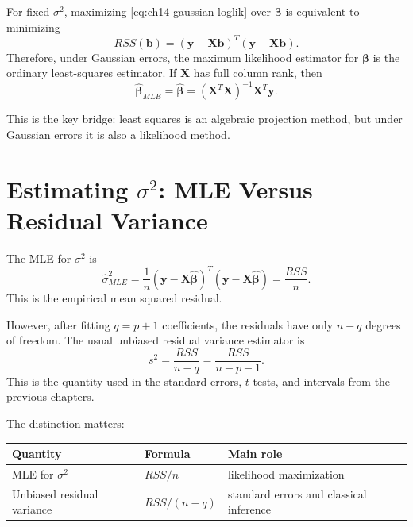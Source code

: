 For fixed \(\sigma^2\), maximizing \eqref{eq:ch14-gaussian-loglik} over \(\boldsymbol{\beta}\) is equivalent to minimizing
\begin{equation}
  RSS(\mathbf{b})=(\mathbf{y}-\mathbf{X}\mathbf{b})^T(\mathbf{y}-\mathbf{X}\mathbf{b}).
\end{equation}
Therefore, under Gaussian errors, the maximum likelihood estimator for \(\boldsymbol{\beta}\) is the ordinary least-squares estimator.  If \(\mathbf{X}\) has full column rank, then
\begin{equation}
  \boxed{
  \widehat{\boldsymbol{\beta}}_{MLE}
  =\widehat{\boldsymbol{\beta}}
  = (\mathbf{X}^T\mathbf{X})^{-1}\mathbf{X}^T\mathbf{y}.
  }
\end{equation}

This is the key bridge: least squares is an algebraic projection method, but under Gaussian errors it is also a likelihood method.

\section[Estimating sigma squared: MLE Versus Residual Variance]{Estimating \(\sigma^2\): MLE Versus Residual Variance}

The MLE for \(\sigma^2\) is
\begin{equation}
  \widehat{\sigma}^2_{MLE}
  =\frac{1}{n}(\mathbf{y}-\mathbf{X}\widehat{\boldsymbol{\beta}})^T
  (\mathbf{y}-\mathbf{X}\widehat{\boldsymbol{\beta}})
  =\frac{RSS}{n}.
  \label{eq:ch14-sigma2-mle}
\end{equation}
This is the empirical mean squared residual.

However, after fitting \(q=p+1\) coefficients, the residuals have only \(n-q\) degrees of freedom.  The usual unbiased residual variance estimator is
\begin{equation}
  s^2
  =\frac{RSS}{n-q}
  =\frac{RSS}{n-p-1}.
  \label{eq:ch14-sigma2-unbiased}
\end{equation}
This is the quantity used in the standard errors, \(t\)-tests, and intervals from the previous chapters.

The distinction matters:
\begin{center}
\begin{tabular}{p{}p{}p{}}
\toprule
\textbf{Quantity} & \textbf{Formula} & \textbf{Main role} \\
\midrule
MLE for \(\sigma^2\) & \(RSS/n\) & likelihood maximization \\
Unbiased residual variance & \(RSS/(n-q)\) & standard errors and classical inference \\
\bottomrule
\end{tabular}
\end{center}

